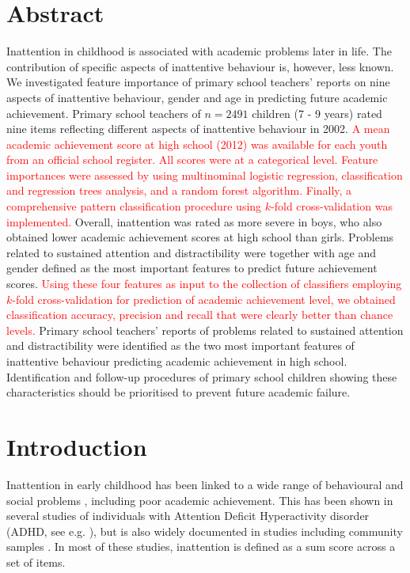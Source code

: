 \documentclass[10pt,letterpaper]{article}
\begin{document}
\section*{Abstract}
Inattention in childhood is associated with academic problems later in life. The contribution of specific aspects of inattentive behaviour is, however, less known. We investigated feature importance of primary school teachers' reports on nine aspects of inattentive behaviour, gender and age in predicting future academic achievement. Primary school teachers of $n=2491$ children (7 - 9 years) rated nine items reflecting different aspects of inattentive behaviour in 2002. \textcolor{red}{A mean academic achievement score at high school (2012) was available for each youth from an official school register. All scores were at a categorical level.} \textcolor{red}{Feature importances were assessed by using multinominal logistic regression, classification and regression trees analysis, and a random forest algorithm. Finally, a comprehensive pattern classification procedure using $k$-fold cross-validation was implemented.}
Overall, inattention was rated as more severe in boys, who also obtained lower academic achievement scores at high school than girls. Problems related to sustained attention and distractibility were together with age and gender defined as the most important features to predict future achievement scores. 
\textcolor{red}{Using these four features as input to the collection of  classifiers
employing $k$-fold cross-validation for prediction of academic achievement level, we obtained classification accuracy, precision and recall that were clearly better than chance levels. }
Primary school teachers' reports of problems related to sustained attention and distractibility were identified as the two most important features of inattentive behaviour predicting academic achievement in high school.  Identification and follow-up procedures of primary school children showing these characteristics should be prioritised to prevent future academic failure. %


\linenumbers

\section*{Introduction}
Inattention in early childhood has been linked to a wide range of behavioural and social problems \cite{Bellanti2000, Connors2012},  including poor academic achievement. This has been shown in several studies of individuals with Attention Deficit Hyperactivity disorder 
(ADHD, see e.g. \cite{Lee2006, Owens2017}), but is also widely documented in studies including community samples \cite{Polderman2010, Metcalfe2013, Pingault2014, Garner2013, Holmberg2014, Gray2014, Salla2016}.  In most of these studies, inattention is defined as a sum score across a set of items.
\end{document}
